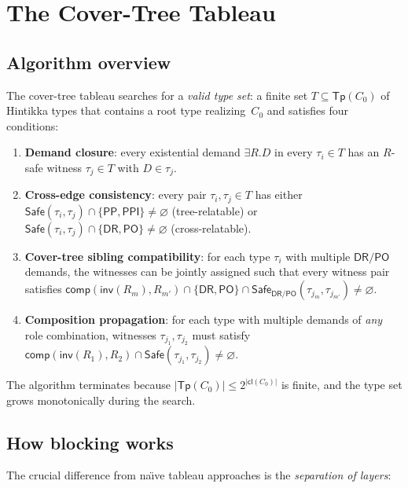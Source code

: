 \documentclass[
]{ceurart}
\theoremstyle{definition}
\newcommand{\DR}{\ensuremath{\mathsf{DR}}}
\newcommand{\PO}{\ensuremath{\mathsf{PO}}}
\newcommand{\PP}{\ensuremath{\mathsf{PP}}}
\newcommand{\PPI}{\ensuremath{\mathsf{PPI}}}
\newcommand{\inv}{\ensuremath{\mathsf{inv}}}
\newcommand{\comp}{\ensuremath{\mathsf{comp}}}
\newcommand{\cl}{\ensuremath{\mathsf{cl}}}
\newcommand{\Tp}{\ensuremath{\mathsf{Tp}}}
\newcommand{\Safe}{\ensuremath{\mathsf{Safe}}}
\begin{document}
\section{The Cover-Tree Tableau}
\label{sec:cover-tree}

\subsection{Algorithm overview}

The cover-tree tableau searches for a \emph{valid type set}:
a finite set $T \subseteq \Tp(C_0)$ of Hintikka types that
contains a root type realizing~$C_0$ and satisfies four conditions:

\begin{enumerate}[label=(CT\arabic*)]
  \item \textbf{Demand closure}: every existential demand
    $\exists R.D$ in every $\tau_i \in T$ has an $R$-safe
    witness $\tau_j \in T$ with $D \in \tau_j$.
  \item \textbf{Cross-edge consistency}: every pair
    $\tau_i, \tau_j \in T$ has either $\Safe(\tau_i,\tau_j)
    \cap \{\PP,\PPI\} \neq \varnothing$ (tree-relatable) or
    $\Safe(\tau_i,\tau_j) \cap \{\DR,\PO\} \neq \varnothing$
    (cross-relatable).
  \item \textbf{Cover-tree sibling compatibility}: for each
    type $\tau_i$ with multiple $\DR/\PO$ demands, the witnesses
    can be jointly assigned such that every witness pair satisfies
    $\comp(\inv(R_m), R_{m'}) \cap \{\DR,\PO\} \cap
    \Safe_{\DR/\PO}(\tau_{j_m}, \tau_{j_{m'}}) \neq \varnothing$.
  \item \textbf{Composition propagation}: for each type with
    multiple demands of \emph{any} role combination, witnesses
    $\tau_{j_1}, \tau_{j_2}$ must satisfy
    $\comp(\inv(R_1), R_2) \cap \Safe(\tau_{j_1}, \tau_{j_2})
    \neq \varnothing$.
\end{enumerate}

The algorithm terminates because $|\Tp(C_0)| \leq 2^{|\cl(C_0)|}$
is finite, and the type set grows monotonically during the search.

\subsection{How blocking works}

The crucial difference from na\"{\i}ve tableau approaches is the
\emph{separation of layers}:
\end{document}
